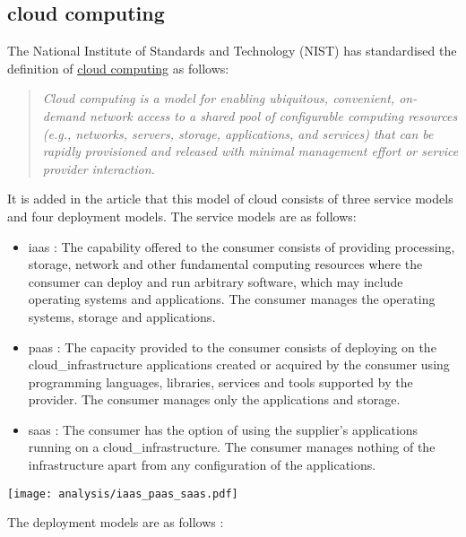 \subsection{\texorpdfstring{\Gls{cloud}}{} computing}
\label{subsec:cloudcomputing}
The National Institute of Standards and Technology (NIST) \cite{nist_definition_cloud_computing} has standardised the definition of \hyperref[subsec:cloudcomputing]{cloud computing} as follows:
\begin{quote}
    \textit{Cloud computing is a model for enabling ubiquitous, convenient, on-demand network access to a shared pool of configurable computing resources (e.g., networks, servers, storage, applications, and services) that can be rapidly provisioned and released with minimal management effort or service provider interaction. \cite{nist_definition_cloud_computing}}
\end{quote}
It is added in the article \cite{nist_definition_cloud_computing} that this model of \gls{cloud} consists of three service models and four deployment models. The service models are as follows:
\begin{itemize}
    \item \acrfull{iaas} : The capability offered to the consumer consists of providing processing, storage, network and other fundamental computing resources where the consumer can deploy and run arbitrary software, which may include operating systems and applications. The consumer manages the operating systems, storage and applications.
    \item \acrfull{paas} : The capacity provided to the consumer consists of deploying on the \gls{cloud_infrastructure} applications created or acquired by the consumer using programming languages, libraries, services and tools supported by the provider. The consumer manages only the applications and storage.
    \item \acrfull{saas} : The consumer has the option of using the supplier's applications running on a \gls{cloud_infrastructure}. The consumer manages nothing of the infrastructure apart from any configuration of the applications.
\end{itemize}
\begin{center}
    \begingroup
    \texttt{[image: analysis/iaas\_paas\_saas.pdf]}
    \label{fig:iaas_paas_saas}
    \endgroup
\end{center}
The deployment models are as follows \cite{nist_definition_cloud_computing} :
